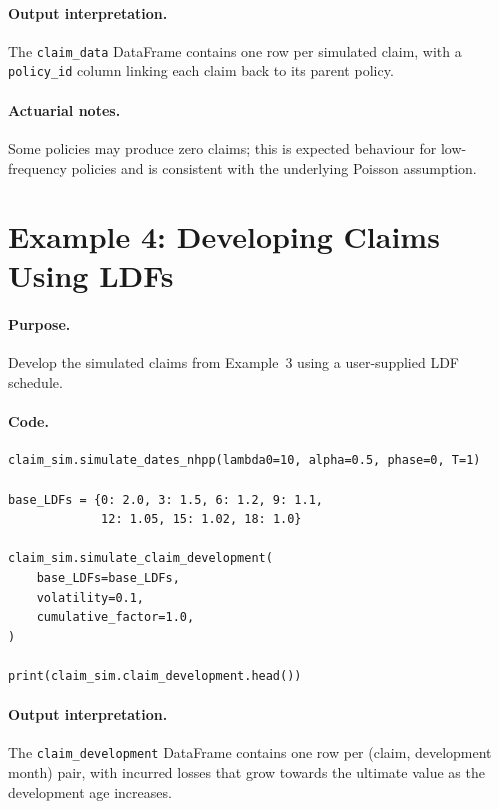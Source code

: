 \paragraph{Output interpretation.} The \texttt{claim\_data} DataFrame
contains one row per simulated claim, with a \texttt{policy\_id} column
linking each claim back to its parent policy.

\paragraph{Actuarial notes.} Some policies may produce zero claims; this
is expected behaviour for low-frequency policies and is consistent with
the underlying Poisson assumption.

\section{Example 4: Developing Claims Using LDFs}

\paragraph{Purpose.} Develop the simulated claims from
Example~3 using a user-supplied LDF schedule.

\paragraph{Code.}
\begin{lstlisting}[style=pythonstyle]
claim_sim.simulate_dates_nhpp(lambda0=10, alpha=0.5, phase=0, T=1)

base_LDFs = {0: 2.0, 3: 1.5, 6: 1.2, 9: 1.1,
             12: 1.05, 15: 1.02, 18: 1.0}

claim_sim.simulate_claim_development(
    base_LDFs=base_LDFs,
    volatility=0.1,
    cumulative_factor=1.0,
)

print(claim_sim.claim_development.head())
\end{lstlisting}

\paragraph{Output interpretation.} The \texttt{claim\_development}
DataFrame contains one row per (claim, development month) pair, with
incurred losses that grow towards the ultimate value as the development
age increases.

